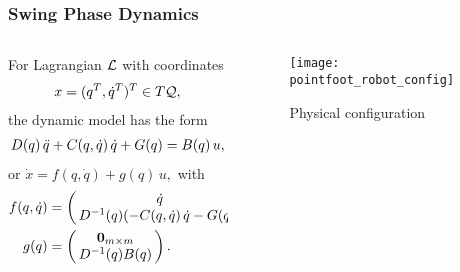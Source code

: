 \begin{frame}[t]
  \frametitle{Swing Phase Dynamics}
  \begin{columns}
    \begin{column}{.55\textwidth}
      For Lagrangian $\mathcal{L}$ with coordinates
      \begin{align*}
        x = (q^{T}, \dot q^{T})^{T} \in T\mathcal{Q},
      \end{align*}
      the dynamic model has the form
      \begin{align*}
        D(q) \, \ddot q + C(q, \dot q) \, \dot q + G(q) = B(q) \, u,
      \end{align*}
      or $\dot x = f(q, \dot q) + g(q) \, u,$ with
      \begin{align*}
        f(\q, \dq) &= \left(\!\!\begin{array}{c}
        \dq\\
        \D^{-1}(\q) (-\C(\q, \dq) \, \dq - \G(\q))
        \end{array}\!\!\right),\\
        g(\q) &= \left(\!\!\begin{array}{c}
        \mathbf{0}_{m \times m}\\
        \D^{-1}(\q) B(\q)
        \end{array}\!\!\right).
      \end{align*}
    \end{column}\!\!
    \begin{column}{.45\textwidth}
      \begin{figure}
        \centering
        \vspace{-10mm}
        \caption{Physical configuration}
        \texttt{[image: pointfoot\_robot\_config]}
      \end{figure}
    \end{column}
  \end{columns}
\end{frame}

